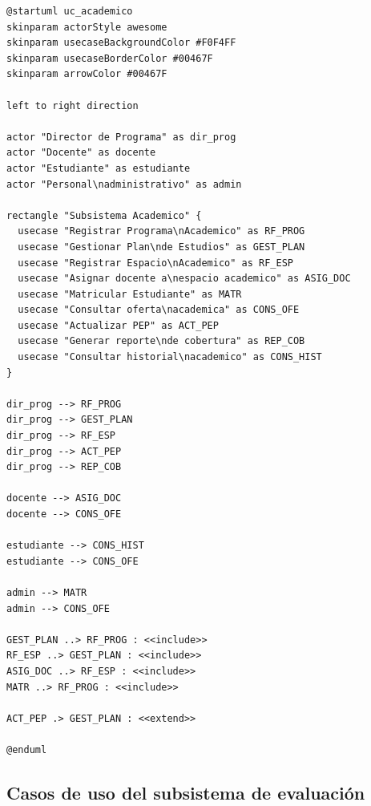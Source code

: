 \begin{lstlisting}[style=plantumlStyle,
  caption={Diagrama de casos de uso del subsistema académico (PlantUML).},
  label={lst:plantuml-uc-acad}]
@startuml uc_academico
skinparam actorStyle awesome
skinparam usecaseBackgroundColor #F0F4FF
skinparam usecaseBorderColor #00467F
skinparam arrowColor #00467F

left to right direction

actor "Director de Programa" as dir_prog
actor "Docente" as docente
actor "Estudiante" as estudiante
actor "Personal\nadministrativo" as admin

rectangle "Subsistema Academico" {
  usecase "Registrar Programa\nAcademico" as RF_PROG
  usecase "Gestionar Plan\nde Estudios" as GEST_PLAN
  usecase "Registrar Espacio\nAcademico" as RF_ESP
  usecase "Asignar docente a\nespacio academico" as ASIG_DOC
  usecase "Matricular Estudiante" as MATR
  usecase "Consultar oferta\nacademica" as CONS_OFE
  usecase "Actualizar PEP" as ACT_PEP
  usecase "Generar reporte\nde cobertura" as REP_COB
  usecase "Consultar historial\nacademico" as CONS_HIST
}

dir_prog --> RF_PROG
dir_prog --> GEST_PLAN
dir_prog --> RF_ESP
dir_prog --> ACT_PEP
dir_prog --> REP_COB

docente --> ASIG_DOC
docente --> CONS_OFE

estudiante --> CONS_HIST
estudiante --> CONS_OFE

admin --> MATR
admin --> CONS_OFE

GEST_PLAN ..> RF_PROG : <<include>>
RF_ESP ..> GEST_PLAN : <<include>>
ASIG_DOC ..> RF_ESP : <<include>>
MATR ..> RF_PROG : <<include>>

ACT_PEP .> GEST_PLAN : <<extend>>

@enduml
\end{lstlisting}

\subsection{Casos de uso del subsistema de evaluación}
\label{subsec:uc-evaluacion}

